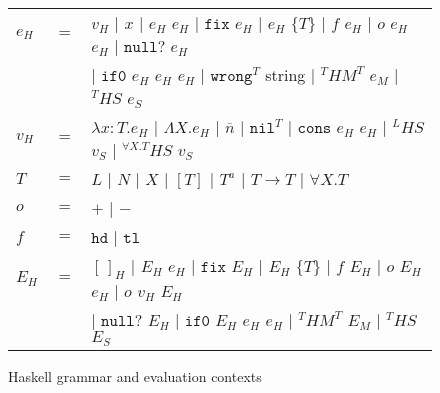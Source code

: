 \begin{figure}[p]
\centering
\begin{tabular}{lcl}
\vspace{5pt}

$e_{H}$ & $=$ & $v_{H}$ $\vert$ $x$ $\vert$ $e_{H}$ $e_{H}$ $\vert$ $\mathtt{fix}$ $e_{H}$ $\vert$ $e_{H}$ $\lbrace T\rbrace$ $\vert$ $f$ $e_{H}$ $\vert$ $o$ $e_{H}$ $e_{H}$ $\vert$ $\mathtt{null?}$ $e_{H}$ \\

\vspace{5pt}

&& $\vert$ $\mathtt{if0}$ $e_{H}$ $e_{H}$ $e_{H}$ $\vert$ $\mathtt{wrong}^{T}$ string $\vert$ $^{T}HM^{T}$ $e_{M}$ $\vert$ $^{T}HS$ $e_{S}$ \\

\vspace{5pt}

$v_{H}$ & $=$ & $\lambda x:T.e_{H}$ $\vert$ $\Lambda X.e_{H}$ $\vert$ $\overline{n}$ $\vert$ $\mathtt{nil}^{T}$ $\vert$ $\mathtt{cons}$ $e_{H}$ $e_{H}$ $\vert$ $^{L}HS$ $v_{S}$ $\vert$ $^{\forall X.T}HS$ $v_{S}$ \\

\vspace{5pt}

$T$ & $=$ & $L$ $\vert$ $N$ $\vert$ $X$ $\vert$ $[T]$ $\vert$ $T^{a}$ $\vert$ $T\rightarrow T$ $\vert$ $\forall X.T$ \\

\vspace{5pt}

$o$ & $=$ & $+$ $\vert$ $-$ \\

\vspace{5pt}

$f$ & $=$ & $\mathtt{hd}$ $\vert$ $\mathtt{tl}$ \\

\vspace{5pt}

$E_{H}$ & $=$ & $[\,]_{H}$ $\vert$ $E_{H}$ $e_{H}$ $\vert$ $\mathtt{fix}$ $E_{H}$ $\vert$ $E_{H}$ $\lbrace T\rbrace$ $\vert$ $f$ $E_{H}$ $\vert$ $o$ $E_{H}$ $e_{H}$ $\vert$ $o$ $v_{H}$ $E_{H}$ \\

\vspace{5pt}

&& $\vert$ $\mathtt{null?}$ $E_{H}$ $\vert$ $\mathtt{if0}$ $E_{H}$ $e_{H}$ $e_{H}$ $\vert$ $^{T}HM^{T}$ $E_{M}$ $\vert$ $^{T}HS$ $E_{S}$
\end{tabular}
\caption{Haskell grammar and evaluation contexts}
\label{hg}
\end{figure}